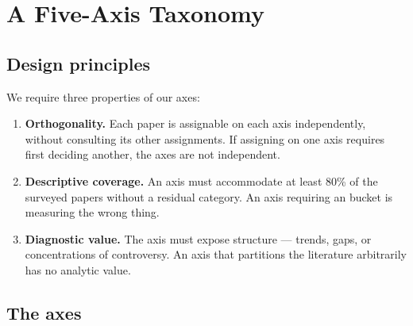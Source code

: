 \section{A Five-Axis Taxonomy}
\label{sec:taxonomy}


\subsection{Design principles}

We require three properties of our axes:

\begin{enumerate}
    \item \textbf{Orthogonality.} Each paper is assignable on each axis
    independently, without consulting its other assignments. If assigning on
    one axis requires first deciding another, the axes are not independent.

    \item \textbf{Descriptive coverage.} An axis must accommodate at least
    80\% of the surveyed papers without a residual  category. An
    axis requiring an  bucket is measuring the wrong thing.

    \item \textbf{Diagnostic value.} The axis must expose structure --- trends,
    gaps, or concentrations of controversy. An axis that partitions the
    literature arbitrarily has no analytic value.
\end{enumerate}

\subsection{The axes}

